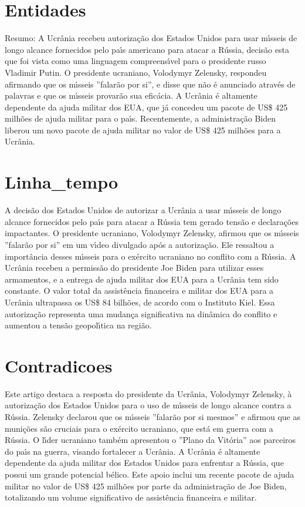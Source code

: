 \documentclass[article,11pt,oneside,a4paper,brazil,sumario=tradicional]{abntex2}%
\begin{document}
\section{Entidades}%
\label{sec:Entidades}%
Resumo:
A Ucr\^ania recebeu autoriza\c{c}\~ao dos Estados Unidos para usar m{\'\i}sseis de longo alcance fornecidos pelo pa{\'\i}s americano para atacar a R\'ussia, decis\~ao esta que foi vista como uma linguagem compreens{\'\i}vel para o presidente russo Vladimir Putin. O presidente ucraniano, Volodymyr Zelensky, respondeu afirmando que os m{\'\i}sseis ''falar\~ao por si'', e disse que n\~ao \'e anunciado atrav\'es de palavras e que os m{\'\i}sseis provar\~ao sua efic\'acia. A Ucr\^ania \'e altamente dependente da ajuda militar dos EUA, que j\'a concedeu um pacote de US\$ 425 milh\~oes de ajuda militar para o pa{\'\i}s. Recentemente, a administra\c{c}\~ao Biden liberou um novo pacote de ajuda militar no valor de US\$ 425 milh\~oes para a Ucr\^ania.

%
\section{Linha\_tempo}%
\label{sec:Linhatempo}%
A decis\~ao dos Estados Unidos de autorizar a Ucr\^ania a usar m{\'\i}sseis de longo alcance fornecidos pelo pa{\'\i}s para atacar a R\'ussia tem gerado tens\~ao e declara\c{c}\~oes impactantes. O presidente ucraniano, Volodymyr Zelensky, afirmou que os m{\'\i}sseis ''falar\~ao por si'' em um v{\'\i}deo divulgado ap\'os a autoriza\c{c}\~ao. Ele ressaltou a import\^ancia desses m{\'\i}sseis para o ex\'ercito ucraniano no conflito com a R\'ussia. A Ucr\^ania recebeu a permiss\~ao do presidente Joe Biden para utilizar esses armamentos, e a entrega de ajuda militar dos EUA para a Ucr\^ania tem sido constante. O valor total da assist\^encia financeira e militar dos EUA para a Ucr\^ania ultrapassa os US\$ 84 bilh\~oes, de acordo com o Instituto Kiel. Essa autoriza\c{c}\~ao representa uma mudan\c{c}a significativa na din\^amica do conflito e aumentou a tens\~ao geopol{\'\i}tica na regi\~ao.

%
\section{Contradicoes}%
\label{sec:Contradicoes}%
Este artigo destaca a resposta do presidente da Ucr\^ania, Volodymyr Zelensky, \`a autoriza\c{c}\~ao dos Estados Unidos para o uso de m{\'\i}sseis de longo alcance contra a R\'ussia. Zelensky declarou que os m{\'\i}sseis ''falar\~ao por si mesmos'' e afirmou que as muni\c{c}\~oes s\~ao cruciais para o ex\'ercito ucraniano, que est\'a em guerra com a R\'ussia. O l{\'\i}der ucraniano tamb\'em apresentou o ''Plano da Vit\'oria'' aos parceiros do pa{\'\i}s na guerra, visando fortalecer a Ucr\^ania. A Ucr\^ania \'e altamente dependente da ajuda militar dos Estados Unidos para enfrentar a R\'ussia, que possui um grande potencial b\'elico. Este apoio inclui um recente pacote de ajuda militar no valor de US\$ 425 milh\~oes por parte da administra\c{c}\~ao de Joe Biden, totalizando um volume significativo de assist\^encia financeira e militar.
\end{document}
